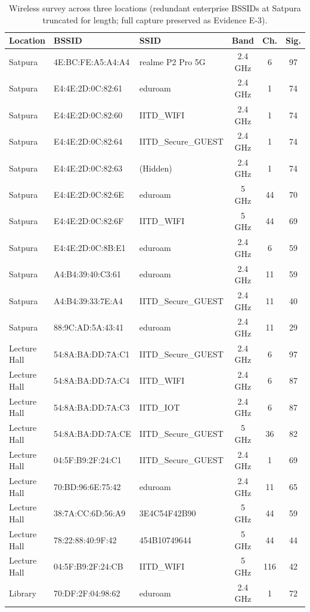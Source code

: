 \begin{table}[H]
\centering
\footnotesize
\caption{Wireless survey across three locations (redundant enterprise BSSIDs at Satpura truncated for length; full capture preserved as Evidence E-3).}
\begin{tabular}{@{}p{1.8cm}p{3.0cm}p{3.2cm}ccc@{}}
\toprule
Location & BSSID & SSID & Band & Ch. & Sig. \\
\midrule
Satpura & 4E:BC:FE:A5:A4:A4 & realme P2 Pro 5G & 2.4 GHz & 6 & 97 \\
Satpura & E4:4E:2D:0C:82:61 & eduroam & 2.4 GHz & 1 & 74 \\
Satpura & E4:4E:2D:0C:82:60 & IITD\_WIFI & 2.4 GHz & 1 & 74 \\
Satpura & E4:4E:2D:0C:82:64 & IITD\_Secure\_GUEST & 2.4 GHz & 1 & 74 \\
Satpura & E4:4E:2D:0C:82:63 & (Hidden) & 2.4 GHz & 1 & 74 \\
Satpura & E4:4E:2D:0C:82:6E & eduroam & 5 GHz & 44 & 70 \\
Satpura & E4:4E:2D:0C:82:6F & IITD\_WIFI & 5 GHz & 44 & 69 \\
Satpura & E4:4E:2D:0C:8B:E1 & eduroam & 2.4 GHz & 6 & 59 \\
Satpura & A4:B4:39:40:C3:61 & eduroam & 2.4 GHz & 11 & 59 \\
Satpura & A4:B4:39:33:7E:A4 & IITD\_Secure\_GUEST & 2.4 GHz & 11 & 40 \\
Satpura & 88:9C:AD:5A:43:41 & eduroam & 2.4 GHz & 11 & 29 \\
\midrule
Lecture Hall & 54:8A:BA:DD:7A:C1 & IITD\_Secure\_GUEST & 2.4 GHz & 6 & 97 \\
Lecture Hall & 54:8A:BA:DD:7A:C4 & IITD\_WIFI & 2.4 GHz & 6 & 87 \\
Lecture Hall & 54:8A:BA:DD:7A:C3 & IITD\_IOT & 2.4 GHz & 6 & 87 \\
Lecture Hall & 54:8A:BA:DD:7A:CE & IITD\_Secure\_GUEST & 5 GHz & 36 & 82 \\
Lecture Hall & 04:5F:B9:2F:24:C1 & IITD\_Secure\_GUEST & 2.4 GHz & 1 & 69 \\
Lecture Hall & 70:BD:96:6E:75:42 & eduroam & 2.4 GHz & 11 & 65 \\
Lecture Hall & 38:7A:CC:6D:56:A9 & 3E4C54F42B90 & 5 GHz & 44 & 59 \\
Lecture Hall & 78:22:88:40:9F:42 & 454B10749644 & 5 GHz & 44 & 44 \\
Lecture Hall & 04:5F:B9:2F:24:CB & IITD\_WIFI & 5 GHz & 116 & 42 \\
\midrule
Library & 70:DF:2F:04:98:62 & eduroam & 2.4 GHz & 1 & 72 \\

\end{tabular}
\end{table}
